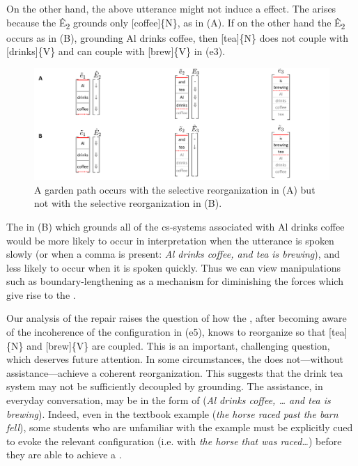   On the other hand, the above utterance might not induce a  effect. The  arises because the  Ê\textsubscript{2} grounds only [coffee]\{N\}, as in {}(A). If on the other hand the  Ê\textsubscript{2} occurs as in (B), grounding {\textbar}Al drinks coffee{\textbar}, then [tea]\{N\} does not couple with [drinks]\{V\} and can couple with [brew]\{V\} in (e3).

  
\begin{figure}
\includegraphics[width=\textwidth]{figures/Tilsen-img131.png}
\caption{A garden path occurs with the selective reorganization in (A) but not with the selective reorganization in (B).}
\label{fig:6:12}
\end{figure}
 

  The  in (B) which grounds all of the cs-systems associated with {\textbar}Al drinks coffee{\textbar} would be more likely to occur in interpretation when the utterance is spoken slowly (or when a comma is present: \textit{Al drinks coffee, and tea is brewing}), and less likely to occur when it is spoken quickly. Thus we can view  manipulations such as boundary-lengthening as a mechanism for diminishing the forces which give rise to the .

  Our analysis of the  repair raises the question of how the , after becoming aware of the incoherence of the configuration in (e5), knows to reorganize so that [tea]\{N\} and [brew]\{V\} are coupled. This is an important, challenging question, which deserves future attention. In some circumstances, the  does not—without assistance—achieve a coherent reorganization. This suggests that the {\textbar}drink tea{\textbar} system may not be sufficiently decoupled by grounding. The assistance, in everyday conversation, may be in the form of  (\textit{Al drinks coffee, … and tea is brewing}). Indeed, even in the textbook example (\textit{the horse raced past the barn fell}), some students who are unfamiliar with the example must be explicitly cued to evoke the relevant configuration (i.e. with \textit{the horse that was raced…}) before they are able to achieve a . 

